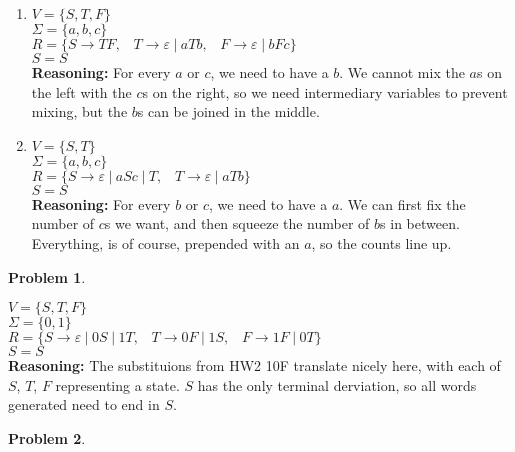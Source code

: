 \documentclass[11pt]{article}
\newcommand{\pipe}{\hspace{3pt}|\hspace{3pt}}
\theoremstyle{definition}
\theoremstyle{case}
\theoremstyle{theorem}
\newtheorem{prob}{Problem}
\begin{document}
\begin{enumerate}[label=(\alph*)]

\item
$V = \{S, T, F\}$ \\
$\Sigma = \{a, b, c\}$ \\
$R = \{
S \rightarrow TF, \hspace{10pt}
T \rightarrow \varepsilon \pipe aTb, \hspace{10pt}
F \rightarrow \varepsilon \pipe bFc
\}$ \\
$S = S$ \\
\textbf{Reasoning:} For every $a$ or $c$, we need to have a $b$. We cannot mix the 
$a$s on the left with the $c$s on the right, so we need intermediary variables
to prevent mixing, but the $b$s can be joined in the middle.

\item
$V = \{S, T\}$ \\
$\Sigma = \{a, b, c\}$ \\
$R = \{
S \rightarrow \varepsilon \pipe aSc \pipe T, \hspace{10pt}
T \rightarrow \varepsilon \pipe aTb
\}$ \\
$S = S$ \\
\textbf{Reasoning:} For every $b$ or $c$, we need to have a $a$. We can first 
fix the number of $c$s we want, and then squeeze the number of $b$s in between.
Everything, is of course, prepended with an $a$, so the counts line up.
\end{enumerate}

\newpage

\begin{prob}\end{prob}

\noindent
$V = \{S, T, F\}$ \\
$\Sigma = \{0, 1\}$ \\
$R = \{
S \rightarrow \varepsilon \pipe 0S \pipe 1T, \hspace{10pt}
T \rightarrow 0F \pipe 1S, \hspace{10pt}
F \rightarrow 1F \pipe 0T
\}$ \\
$S = S$\\
\textbf{Reasoning:} The substituions from HW2 10F translate nicely here, with each of 
$S$, $T$, $F$ representing a state. $S$ has the only terminal derviation, so all words
generated need to end in $S$.

\begin{prob}\end{prob}
\end{document}
